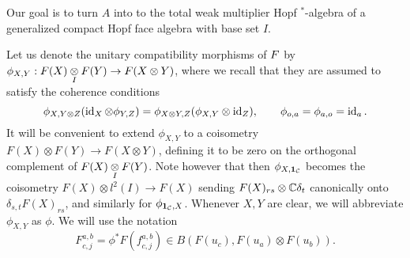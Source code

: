 Our goal is to turn $A$ into to the total weak multiplier Hopf $^*$-algebra of a generalized compact Hopf face algebra with base set $I$. 



Let us denote the unitary compatibility morphisms of $F$ by $\phi_{X,Y}:F(X)\underset{I}{\otimes} F(Y)\rightarrow F(X\otimes Y)$, where we recall that they are assumed to satisfy the coherence conditions  \[\phi_{X,Y\otimes Z}(\operatorname{id}_X\otimes \phi_{Y,Z}) = \phi_{X\otimes Y,Z}(\phi_{X,Y}\otimes \operatorname{id}_Z),\qquad \phi_{o,a} = \phi_{a,o} = \operatorname{id}_a.\] It will be convenient to extend $\phi_{X,Y}$ to a coisometry $F(X)\otimes F(Y)\rightarrow F(X\otimes Y)$, defining it to be zero on the orthogonal complement of $F(X)\underset{I}{\otimes} F(Y)$. Note however that then $\phi_{X,\mathbf{1}_{\mathcal{C}}}$ becomes the coisometry $F(X)\otimes l^2(I)\rightarrow F(X)$ sending $F(X)_{rs} \otimes \mathbb{C}\delta_t$ canonically onto $\delta_{s,t}F(X)_{rs}$, and similarly for $\phi_{\mathbf{1}_{\mathcal{C}},X}$. Whenever $X,Y$ are clear, we will abbreviate $\phi_{X,Y}$ as $\phi$. We will use the notation \[F^{a,b}_{c,j} = \phi^* F(f^{a,b}_{c,j}) \in B(F(u_c),F(u_a)\otimes F(u_b)).\]



